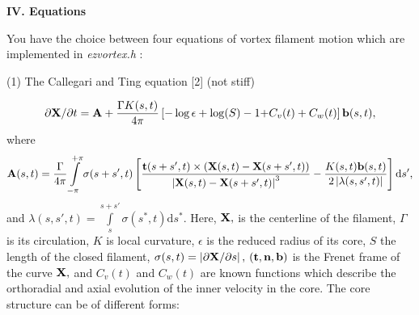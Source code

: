 {\bf IV. Equations} 

 You have the choice between four equations of vortex filament motion which are implemented in {\it ezvortex.h} :
\begin{list}{dummy}
{\partopsep=-10pt\parsep=-10pt\itemsep=12pt}

\item[(1)] The Callegari and Ting equation [2] (not stiff)

	\begin{eqnarray}
	\label{eCT}
		\partial{ \mbox{\bf X}}/\partial{t}=\mbox{\bf A}+{\Gamma K(s,t) \over{4\pi}}\left[{-\log\epsilon+\log(S)-1}
		{+C_v(t)+C_w(t)}\right]\mbox{\bf b}(s,t),
        \end{eqnarray} 
where   
   	\begin{eqnarray}
	\mbox{\bf A}(s,t)= {\Gamma\over{4\pi}}  
		\int\limits_{-\pi}^{+\pi} \sigma(s+s',t)\left[ 
		{\mbox{\bf t}(s+s',t)\times(\mbox{\bf X}(s,t)-\mbox{\bf X}(s+s',t)) 
		\over{\left| \mbox{\bf X}(s,t)- \mbox{\bf X}(s+s',t)\right|}^3}
	-{K(s,t)\mbox{\bf b}(s,t)\over{2\left|\lambda(s,s',t)  \right|}} 
		\right]\mbox{d}s', \nonumber
        \end{eqnarray}
and $\lambda(s,s',t)=\int\limits_{s}^{s+s'}\sigma(s^*,t)\mbox{d}s^*.$
Here, $\mbox{\bf X},$ is the centerline of the filament, $\Gamma$ is its circulation, $K$ is local curvature, $\epsilon$ is the reduced radius of its core, $S$ the length of the closed filament, $\sigma(s,t)=\left| \partial\mbox{\bf X}/\partial s \right|,$ $(\mbox{\bf t},\mbox{\bf n},\mbox{\bf b})$ is the Frenet frame of the curve $\mbox{\bf X},$
and $C_v(t)$ and $C_w(t)$ are known functions which describe the orthoradial and axial evolution of the inner velocity in the core.  The core structure can be of different forms: 

\begin{list}{dummy}
{\partopsep=-10pt\parsep=-10pt\itemsep=12pt}


\end{list}
\end{list}
